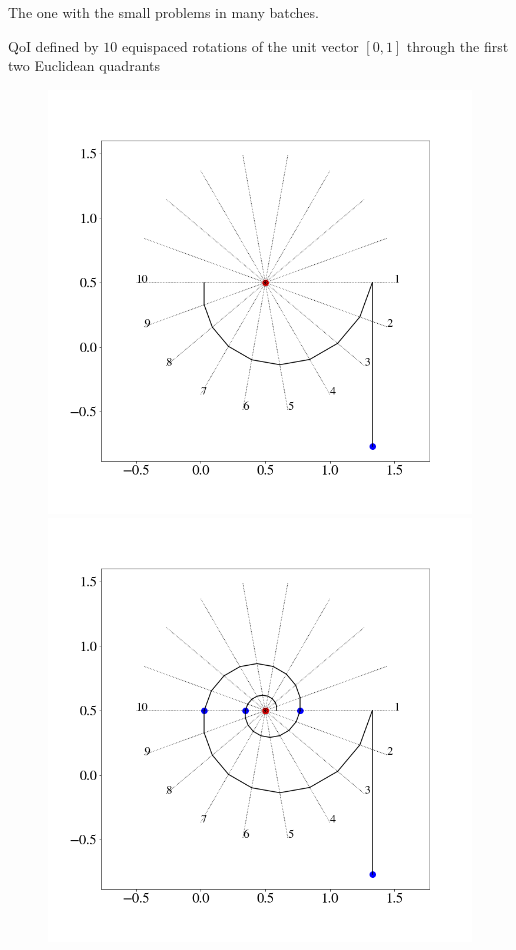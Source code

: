 \begin{frame}[t]

The one with the small problems in many batches.

QoI defined by $10$ equispaced rotations of the unit vector $[0, 1]$ through the first two Euclidean quadrants

\begin{figure}
  \centering
  \includegraphics[width=0.475\linewidth]{figures/iterative/10D-firstepoch.png}
  \includegraphics[width=0.475\linewidth]{figures/iterative/10D-fewepochs.png}
  \label{fig:iterative-linear-demo}
\end{figure}

\end{frame}

